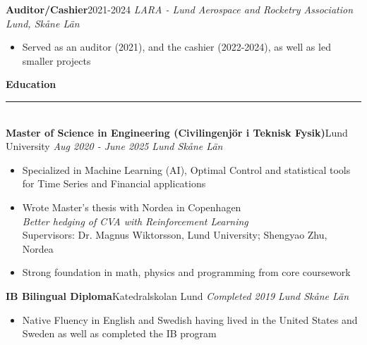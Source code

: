 \documentclass[10pt, a4paper, english]{article}
\newcommand{\mysection}[1]{\color{black}\textbf{\LARGE{#1}}\\
				        \rule[1em]{\widthof{\textbf{\LARGE{#1}}}}{1.333pt} \color{darkgray!80!black}\\ \vspace{-1em}}
\newcommand{\WExperience}[4]{\normalsize \noindent \textbf{#1}\hfill #3 \newline \textit{\footnotesize #2} \hfill \textit{\footnotesize #4} \vspace{-0.35em}}
\begin{document}
\begin{paracol}{2}
\vspace{0.3em}
\WExperience{Auditor/Cashier}{LARA - Lund Aerospace and Rocketry Association}{2021-2024}{Lund, Skåne Län}
\begin{itemize}[leftmargin =\widthof{$\bullet$~~~~~}]
\item Served as an auditor (2021), and the cashier (2022-2024), as well as led smaller projects
\end{itemize}

\vspace{.75em}
\mysection{Education}
\WExperience{Master of Science in Engineering (Civilingenjör i Teknisk Fysik)}{Aug 2020 - June 2025}{Lund University}{Lund Skåne Län}
\begin{itemize}[leftmargin =\widthof{$\bullet$~~~~~}]
\item Specialized in Machine Learning (AI), Optimal Control and statistical tools for Time Series and Financial applications
\item Wrote Master's thesis with Nordea in Copenhagen \\ \textit{Better hedging of CVA with Reinforcement Learning} \\ Supervisors: Dr. Magnus Wiktorsson, Lund University; Shengyao Zhu, Nordea
\item Strong foundation in math, physics and programming from core coursework
\end{itemize}

\WExperience{IB Bilingual Diploma}{Completed 2019}{Katedralskolan Lund}{Lund Skåne Län}
\begin{itemize}[leftmargin =\widthof{$\bullet$~~~~~}]
\item Native Fluency in English and Swedish having lived in the United States and Sweden as well as completed the IB program
\end{itemize}

\end{paracol}
\end{document}
